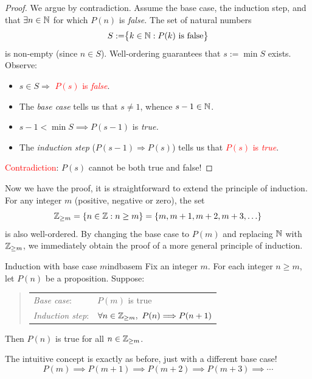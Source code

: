 \begin{proof}
	We argue by contradiction. Assume the base case, the induction step, and that $\exists n\in\mathbb{N}$ for which $P(n)$ is \emph{false.} The set of natural numbers
	\[
		S:=\bigr\{k\in\mathbb{N}:P(k)\text{ is false}\bigr\}
	\]
	is non-empty (since $n\in S$). Well-ordering guarantees that $s:=\min S$ exists. Observe:
	\begin{itemize}\itemsep0pt\parskip2pt
	  \item $s\in S\Longrightarrow$ \textcolor{red}{$P(s)$ is \emph{false}}.
	  \item The \emph{base case} tells us that $s\neq 1$, whence $s-1\in\mathbb{N}$.
	  \item $s-1<\min S\implies P(s-1)$ is \emph{true.}
	  \item The \emph{induction step} ($P(s-1)\Longrightarrow P(s)$) tells us that \textcolor{red}{$P(s)$ is \emph{true}}.
	\end{itemize}
	\textcolor{red}{Contradiction}: $P(s)$ cannot be both true and false!
\end{proof}


Now we have the proof, it is straightforward to extend the principle of induction. For any integer $m$ (positive, negative or zero), the set
\[
	\mathbb{Z}_{\ge m}=\{n\in\mathbb{Z}:n\ge m\}=\{m,m+1,m+2,m+3,\ldots\}
\]
is also well-ordered. By changing the base case to $P(m)$ and replacing $\mathbb{N}$ with $\mathbb{Z}_{\ge m}$, we immediately obtain the proof of a more general principle of induction.

\begin{cor}{Induction with base case $m$}{indbasem}
	Fix an integer $m$. For each integer $n\ge m$, let $P(n)$ be a proposition. Suppose:
	\begin{quote}
		\begin{tabular}{@{}ll}
			\emph{Base case}: &$P(m)$ is true\\[5pt]
			\emph{Induction step}: &$\forall n\in\mathbb{Z}_{\ge m},\ P(n)\Longrightarrow P(n+1)$
		\end{tabular}
	\end{quote}
	Then $P(n)$ is true for all $n\in\mathbb{Z}_{\ge m}$.
\end{cor}

The intuitive concept is exactly as before, just with a different base case!
\[
	P(m)\implies P(m+1)\implies P(m+2)\implies P(m+3)\implies\cdots
\]
\goodbreak




